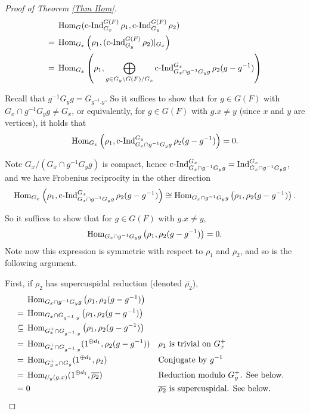 		\begin{proof}[Proof of Theorem \ref{Thm Hom}]
			\begin{equation*}
				\begin{aligned}
					&\operatorname{\operatorname{Hom}}_G(\operatorname{\operatorname{c-Ind}}_{G_x}^{G(F)}\rho_1, \operatorname{\operatorname{c-Ind}}_{G_y}^{G(F)}\rho_2)\\
					=\;&\operatorname{\operatorname{Hom}}_{G_x}\left(\rho_1,(\operatorname{\operatorname{c-Ind}}_{G_y}^{G(F)}\rho_2)|_{G_x}\right)\\
					=\;& \operatorname{\operatorname{Hom}}_{G_x}\left(\rho_1, \bigoplus_{g \in {G_y\backslash G(F)/G_x}}\operatorname{\operatorname{c-Ind}}_{G_x \cap g^{-1}G_yg}^{G_x}\rho_2(g-g^{-1})\right)
				\end{aligned}
			\end{equation*}
			
			Recall that $g^{-1}G_yg=G_{g^{-1}.y}$. So it suffices to show that for $g \in G(F)$ with $G_x \cap g^{-1}G_yg \neq G_x$, or equivalently, for $g \in G(F)$ with $g.x \neq y$ (since $x$ and $y$ are vertices), it holds that
			$$\operatorname{\operatorname{Hom}}_{G_x}\left(\rho_1, \operatorname{\operatorname{c-Ind}}_{G_x \cap g^{-1}G_yg}^{G_x}\rho_2(g-g^{-1})\right)=0.$$
			
			Note $G_x/(G_x \cap g^{-1}G_yg)$ is compact, hence $\operatorname{\operatorname{c-Ind}}_{G_x \cap g^{-1}G_yg}^{G_x}=\operatorname{Ind}_{G_x \cap g^{-1}G_yg}^{G_x}$, and we have Frobenius reciprocity in the other direction
			$$\operatorname{\operatorname{Hom}}_{G_x}\left(\rho_1, \operatorname{\operatorname{c-Ind}}_{G_x \cap g^{-1}G_yg}^{G_x}\rho_2(g-g^{-1})\right) \cong \operatorname{\operatorname{Hom}}_{G_x \cap g^{-1}G_yg}\left(\rho_1, \rho_2(g-g^{-1})\right).$$
			
			So it suffices to show that for $g \in G(F)$ with $g.x \neq y$,
			$$\operatorname{\operatorname{Hom}}_{G_x \cap g^{-1}G_yg}\left(\rho_1, \rho_2(g-g^{-1})\right)=0.$$
			Note now this expression is symmetric with respect to $\rho_1$ and $\rho_2$, and so is the following argument.
			
			First, if $\rho_2$ has supercuspidal reduction (denoted $\overline{\rho_2}$),
			\begin{align*}    	
				& \Hom_{G_x \cap g^{-1}G_yg}\left(\rho_1, \rho_2(g-g^{-1})\right) \\
				=\;& \Hom_{G_x \cap G_{g^{-1}.y}}\left(\rho_1, \rho_2(g-g^{-1})\right) \\
				\subseteq\;& \Hom_{G_x^+ \cap G_{g^{-1}.y}}\left(\rho_1, \rho_2(g-g^{-1})\right) && %
				\\
				=\;& \Hom_{G_x^+ \cap G_{g^{-1}.y}}(1^{\oplus d_1}, \rho_2(g-g^{-1})) && \text{$\rho_1$ is trivial on $G_x^+$ }\\
				=\;& \Hom_{G_{g.x}^+ \cap G_y}(1^{\oplus d_1}, \rho_2) && \text{Conjugate by $g^{-1}$}\\
				=\;& \Hom_{U_y(g.x)}(1^{\oplus d_1}, \overline{\rho_2}) && \text{Reduction modulo $G_y^+$. See below.}\\
				=\;& 0 && \text{$\overline{\rho_2}$ is supercuspidal. See below.}
			\end{align*}
			

\end{proof}
